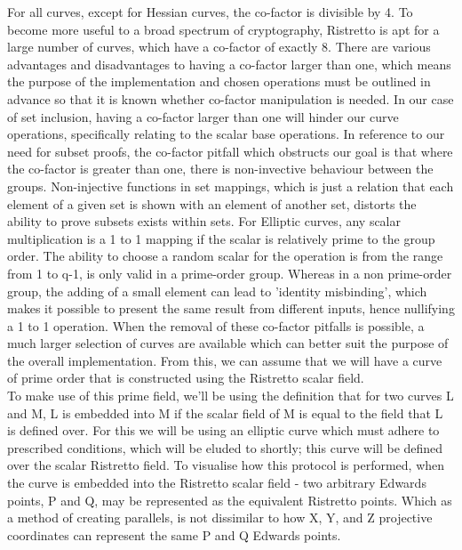 \documentclass[letterpaper, 10 pt, conference]{ieeeconf}  %
\begin{document}
For all curves, except for Hessian curves, the co-factor is divisible by 4. To become more useful to a broad spectrum of cryptography, Ristretto is apt for a large number of curves, which have a co-factor of exactly 8. There are various advantages and disadvantages to having a co-factor larger than one, which means the purpose of the implementation and chosen operations must be outlined in advance so that it is known whether co-factor manipulation is needed. In our case of set inclusion, having a co-factor larger than one will hinder our curve operations, specifically relating to the scalar base operations. In reference to our need for subset proofs, the co-factor pitfall which obstructs our goal is that where the co-factor is greater than one, there is non-invective behaviour between the groups. Non-injective functions in set mappings, which is just a relation that each element of a given set is shown with an element of another set, distorts the ability to prove subsets exists within sets. For Elliptic curves, any scalar multiplication is a 1 to 1 mapping if the scalar is relatively prime to the group order. The ability to choose a random scalar for the operation is from the range from 1 to q-1, is only valid in a prime-order group. Whereas in a non prime-order group, the adding of a small element can lead to 'identity misbinding', which makes it possible to present the same result from different inputs, hence nullifying a 1 to 1 operation. When the removal of these co-factor pitfalls is possible, a much larger selection of curves are available which can better suit the purpose of the overall implementation. From this, we can assume that we will have a curve of prime order that is constructed using the Ristretto scalar field.  \\

To make use of this prime field, we’ll be using the definition that for two curves L and M, L is embedded into M if the scalar field of M is equal to the field that L is defined over. For this we will be using an elliptic curve which must adhere to prescribed conditions, which will be eluded to shortly; this curve will be defined over the scalar Ristretto field. To visualise how this protocol is performed, when the curve is embedded into the Ristretto scalar field - two arbitrary Edwards points, P and Q, may be represented as the equivalent Ristretto points. Which as a method of creating parallels, is not dissimilar to how X, Y, and Z projective coordinates can represent the same P and Q Edwards points. \\
\end{document}
